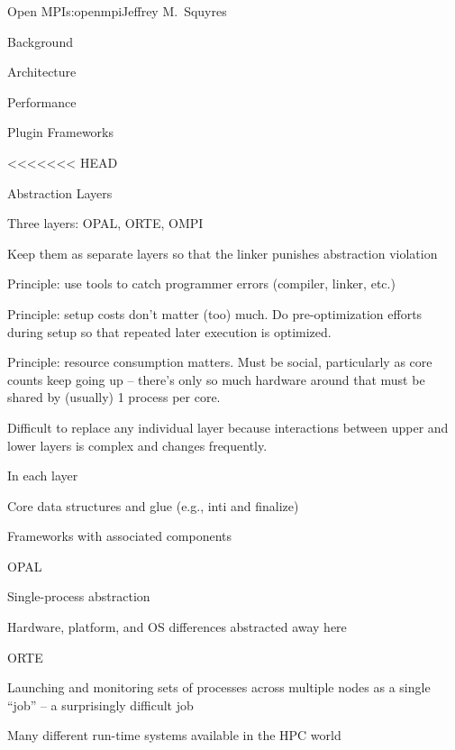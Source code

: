 \begin{aosachapter}{Open MPI}{s:openmpi}{Jeffrey M.\ Squyres}
\begin{aosasect1}{Background}
\begin{aosasect1}{Architecture}
\begin{aosasect2}{Performance}
\begin{aosasect2}{Plugin Frameworks}
\end{aosasect2}


<<<<<<< HEAD
\begin{aosasect2}{Abstraction Layers}

\begin{aosaitemize}
\item Three layers: OPAL, ORTE, OMPI
  \begin{aosaitemize}
  \item Keep them as separate layers so that the linker punishes
    abstraction violation
  \item Principle: use tools to catch programmer errors (compiler,
    linker, etc.)
  \item Principle: setup costs don't matter (too) much.  Do
    pre-optimization efforts during setup so that repeated later
    execution is optimized.
  \item Principle: resource consumption matters.  Must be social,
    particularly as core counts keep going up -- there's only so much
    hardware around that must be shared by (usually) 1 process per
    core.
  \end{aosaitemize}

\item Difficult to replace any individual layer because interactions
  between upper and lower layers is complex and changes frequently.

\item In each layer
  \begin{aosaitemize}
  \item Core data structures and glue (e.g., inti and finalize)
  \item Frameworks with associated components
  \end{aosaitemize}

\item OPAL
  \begin{aosaitemize}
  \item Single-process abstraction
  \item Hardware, platform, and OS differences abstracted away here
  \end{aosaitemize}

\item ORTE
  \begin{aosaitemize}
  \item Launching and monitoring sets of processes across multiple
    nodes as a single ``job'' -- a surprisingly difficult job
  \item Many different run-time systems available in the HPC world
  \end{aosaitemize}


\end{aosaitemize}
\end{aosasect2}
\end{aosasect2}
\end{aosasect1}
\end{aosasect1}
\end{aosachapter}
